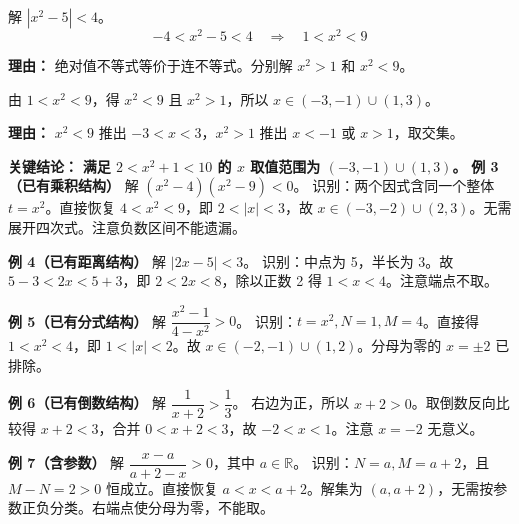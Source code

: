 \begin{examplebox}
\begin{description}[style=nextline, leftmargin=2.8em, labelsep=0.5em, itemsep=0.45em]
    \item[\textbf{第三步（解绝对值不等式）：}] 解 $|x^2 - 5| < 4$。
    \[
    -4 < x^2 - 5 < 4 \quad \Rightarrow \quad 1 < x^2 < 9
    \]
    \par\textbf{理由：}
    绝对值不等式等价于连不等式。分别解 $x^2 > 1$ 和 $x^2 < 9$。

    \item[\textbf{第四步（求 $x$ 范围）：}] 由 $1 < x^2 < 9$，得 $x^2 < 9$ 且 $x^2 > 1$，所以 $x \in (-3, -1) \cup (1, 3)$。
    \par\textbf{理由：}
    $x^2 < 9$ 推出 $-3 < x < 3$，$x^2 > 1$ 推出 $x < -1$ 或 $x > 1$，取交集。
\end{description}

\textbf{\textcolor{CExample}{关键结论：}} \textbf{满足 $2 < x^2+1 < 10$ 的 $x$ 取值范围为 $(-3, -1) \cup (1, 3)$。}
\medskip
\textbf{例 3（已有乘积结构）} 解 $(x^2-4)(x^2-9)<0$。
识别：两个因式含同一个整体 $t=x^2$。直接恢复 $4<x^2<9$，即 $2<|x|<3$，故 $x\in(-3,-2)\cup(2,3)$。无需展开四次式。注意负数区间不能遗漏。

\medskip
\textbf{例 4（已有距离结构）} 解 $|2x-5|<3$。
识别：中点为 5，半长为 3。故 $5-3<2x<5+3$，即 $2<2x<8$，除以正数 2 得 $1<x<4$。注意端点不取。

\medskip
\textbf{例 5（已有分式结构）} 解 $\dfrac{x^2-1}{4-x^2}>0$。
识别：$t=x^2,N=1,M=4$。直接得 $1<x^2<4$，即 $1<|x|<2$。故 $x\in(-2,-1)\cup(1,2)$。分母为零的 $x=\pm2$ 已排除。

\medskip
\textbf{例 6（已有倒数结构）} 解 $\dfrac1{x+2}>\dfrac13$。
右边为正，所以 $x+2>0$。取倒数反向比较得 $x+2<3$，合并 $0<x+2<3$，故 $-2<x<1$。注意 $x=-2$ 无意义。

\medskip
\textbf{例 7（含参数）} 解 $\dfrac{x-a}{a+2-x}>0$，其中 $a\in\mathbb R$。
识别：$N=a,M=a+2$，且 $M-N=2>0$ 恒成立。直接恢复 $a<x<a+2$。解集为 $(a,a+2)$，无需按参数正负分类。右端点使分母为零，不能取。
\end{examplebox}
